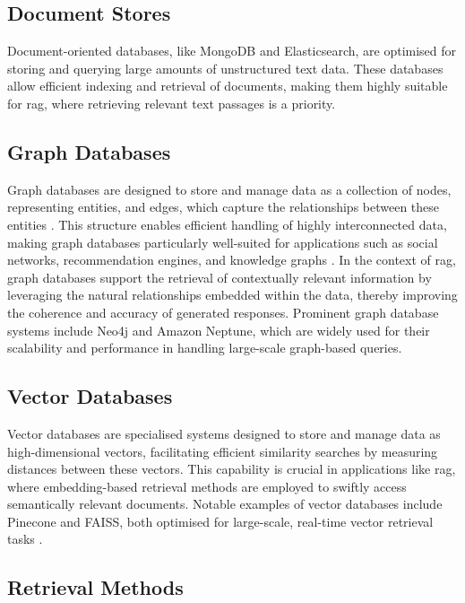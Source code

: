 \subsection{Document Stores}\label{sec:document-stores}
Document-oriented databases, like MongoDB and Elasticsearch, are optimised for storing and querying large amounts of unstructured text data. 
These databases allow efficient indexing and retrieval of documents, making them highly suitable for \ac{rag}, where retrieving relevant text passages is a priority.
\subsection{Graph Databases}\label{sec:graph-databases}
Graph databases are designed to store and manage data as a collection of nodes, representing entities, and edges, which capture the relationships between these entities \citep{Robinson2015}. 
This structure enables efficient handling of highly interconnected data, making graph databases particularly well-suited for applications such as social networks, recommendation engines, and knowledge graphs \citep{Angles2008}. 
In the context of \ac{rag}, graph databases support the retrieval of contextually relevant information by leveraging the natural relationships embedded within the data, thereby improving the coherence and accuracy of generated responses. 
Prominent graph database systems include Neo4j and Amazon Neptune, which are widely used for their scalability and performance in handling large-scale graph-based queries.

\subsection{Vector Databases}\label{sec:vector-databases}
Vector databases are specialised systems designed to store and manage data as high-dimensional vectors, facilitating efficient similarity searches by measuring distances between these vectors. 
This capability is crucial in applications like \ac{rag}, where embedding-based retrieval methods are employed to swiftly access semantically relevant documents. 
Notable examples of vector databases include Pinecone and FAISS, both optimised for large-scale, real-time vector retrieval tasks \citep{Johnson2019}.

\subsection{Retrieval Methods}\label{sec:retrieval-methods}

